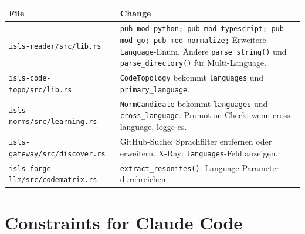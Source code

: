 \documentclass[11pt,a4paper]{article}
\begin{document}
\begin{longtable}{lp{10cm}}
\toprule
\textbf{File} & \textbf{Change} \\
\midrule
\texttt{isls-reader/src/lib.rs}
  & \texttt{pub mod python; pub mod typescript; pub mod go; 
    pub mod normalize;} Erweitere \texttt{Language}-Enum. 
    \"Andere \texttt{parse\_string()} und 
    \texttt{parse\_directory()} f\"ur Multi-Language. \\
\texttt{isls-code-topo/src/lib.rs}
  & \texttt{CodeTopology} bekommt \texttt{languages} 
    und \texttt{primary\_language}. \\
\texttt{isls-norms/src/learning.rs}
  & \texttt{NormCandidate} bekommt \texttt{languages} 
    und \texttt{cross\_language}. 
    Promotion-Check: wenn cross-language, logge es. \\
\texttt{isls-gateway/src/discover.rs}
  & GitHub-Suche: Sprachfilter entfernen oder erweitern. 
    X-Ray: \texttt{languages}-Feld anzeigen. \\
\texttt{isls-forge-llm/src/codematrix.rs}
  & \texttt{extract\_resonites()}: Language-Parameter 
    durchreichen. \\
\bottomrule
\end{longtable}


\section{Constraints for Claude Code}
\end{document}
